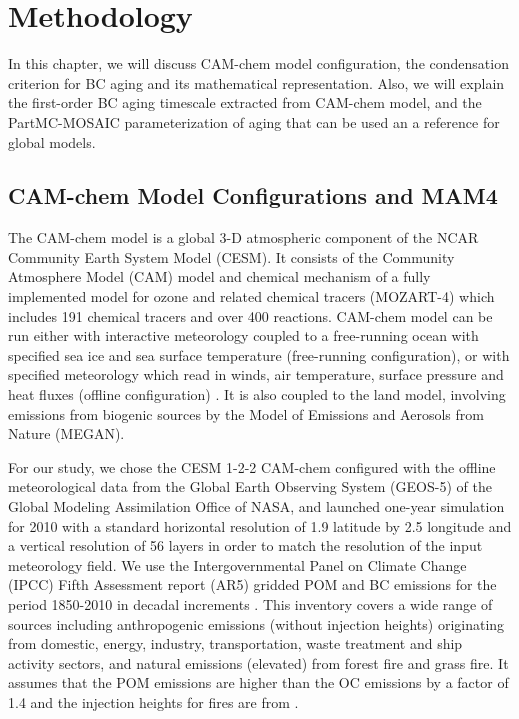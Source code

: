 \documentclass[12pt, fullpage]{uiucthesis2009}
\begin{document}
	\chapter{Methodology}
	In this chapter, we will discuss CAM-chem model configuration, the condensation criterion for BC aging and its mathematical representation. Also, we will explain the first-order BC aging timescale extracted from CAM-chem model, and the PartMC-MOSAIC parameterization of aging that can be used an a reference for global models.
	
	\section{CAM-chem Model Configurations and MAM4}
	
	The CAM-chem model is a global 3-D atmospheric component of the NCAR Community Earth System Model (CESM). It consists of the Community Atmosphere Model (CAM) model and chemical mechanism of a fully implemented model for ozone and related chemical tracers (MOZART-4) which includes 191 chemical tracers and over 400 reactions. CAM-chem model can be run either with interactive meteorology coupled to a free-running ocean with specified sea ice and sea surface temperature (free-running configuration), or with specified meteorology which read in winds, air temperature, surface pressure and heat fluxes (offline configuration) \citep{Lamarque2012}. It is also coupled to the land model, involving emissions from biogenic sources by the Model of Emissions and Aerosols from Nature (MEGAN). 
	
	For our study, we chose the CESM 1-2-2 CAM-chem configured with the offline meteorological data from the Global Earth Observing System (GEOS-5) of the Global Modeling Assimilation Office of NASA, and launched one-year simulation for 2010 with a standard horizontal resolution of 1.9  latitude by 2.5 longitude and a vertical resolution of 56 layers in order to match the resolution of the input meteorology field. We use the Intergovernmental Panel on Climate Change (IPCC) Fifth Assessment report (AR5) gridded POM and BC emissions for the period 1850-2010 in decadal increments \citep{Lamarque2010}. This inventory covers a wide range of sources including anthropogenic emissions (without injection heights) originating from domestic, energy, industry, transportation, waste treatment and ship activity sectors, and natural emissions (elevated) from forest fire and grass fire. It assumes that the POM emissions are higher than the OC emissions by a factor of 1.4 \citep{Liu2012} and the injection heights for fires are from \citet{dentener2006emissions}. 
\end{document}
